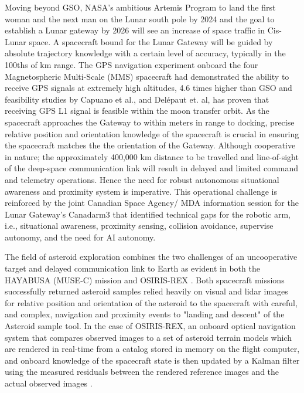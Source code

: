 Moving beyond GSO, NASA’s ambitious Artemis Program to land the first woman and the next man on the Lunar south pole by 2024 \cite{nasaArtermis20} and the goal to establish a Lunar gateway \cite{winternitzGpsLunarGateway19} by 2026 will see an increase of space traffic in Cis-Lunar space. A spacecraft bound for the Lunar Gateway will be guided by absolute trajectory knowledge with a certain level of accuracy, typically in the 100ths of km range. The GPS navigation experiment onboard the four Magnetospheric Multi-Scale (MMS) spacecraft had demonstrated the ability to receive GPS signals at extremely high altitudes, 4.6 times higher than GSO \cite{winternitzGpsLunarGateway19} and feasibility studies by Capuano et al.,  \cite{capuanoGpsLunarNav16} and Delépaut et. al, \cite{DelepautGpsLunarNav16} has proven that receiving GPS L1 signal is feasible within the moon transfer orbit. As the spacecraft approaches the Gateway to within meters in range to docking, precise relative position and orientation knowledge of the spacecraft is crucial in ensuring the spacecraft matches the the orientation of the Gateway. Although cooperative in nature; the approximately 400,000 km distance to be travelled  and line-of-sight of the deep-space communication link will result in delayed and limited command and telemetry operations. Hence the need for robust autonomous situational awareness and proximity system is imperative. This operational challenge is reinforced by the joint Canadian Space Agency/ MDA information session for the Lunar Gateway’s Canadarm3 \footnotemark{} that identified technical gaps for the robotic arm, i.e., situational awareness, proximity sensing, collision avoidance, supervise autonomy, and the need for AI autonomy.

The field of asteroid exploration combines the two challenges of an uncooperative target and delayed communication link to Earth as evident in both the HAYABUSA (MUSE-C) mission \cite{Kobayasi3DofPoseAsteroid15} and OSIRIS-REX \cite{leonarOsirusRex19}. Both spacecraft missions successfully returned asteroid samples relied heavily on visual and lidar images for relative position and orientation of the asteroid to the spacecraft with careful, and complex, navigation and proximity events to "landing and descent" of the Asteroid sample tool. In the case of OSIRIS-REX, an onboard optical navigation system that compares observed images to a set of asteroid terrain models which are rendered in real-time from a catalog stored in memory on the flight computer, and onboard knowledge of the spacecraft state is then updated by a Kalman filter using the measured residuals between the rendered reference images and the actual observed images \cite{lorenzOsirusRexAutoNav}.      


